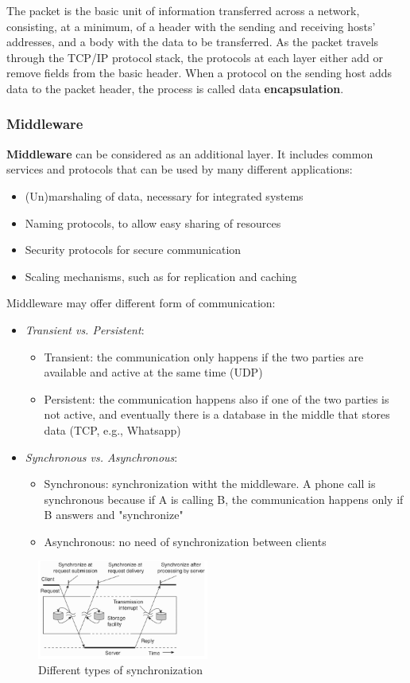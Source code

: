 \documentclass[10pt,a4paper]{article}
\begin{document}
The packet is the basic unit of information transferred across a network, consisting, at a minimum, of a header with the sending and receiving hosts' addresses, and a body with the data to be transferred. As the packet travels through the TCP/IP protocol stack, the protocols at each layer either add or remove fields from the basic header. When a protocol on the sending host adds data to the packet header, the process is called data \textbf{encapsulation}.
\subsubsection{Middleware}
\textbf{Middleware} can be considered as an additional layer. It includes common services and protocols that can be used by many different applications:
\begin{itemize}
	\item (Un)marshaling of data, necessary for integrated systems
	\item Naming protocols, to allow easy sharing of resources
	\item Security protocols for secure communication
	\item Scaling mechanisms, such as for replication and caching
\end{itemize}
Middleware may offer different form of communication:
\begin{itemize}
	\item \textit{Transient vs. Persistent}:
	\begin{itemize}
		\item Transient: the communication only happens if the two parties are available and active at the same time (UDP)
		\item Persistent: the communication happens also if one of the two parties is not active, and eventually there is a database in the middle that stores data (TCP, e.g., Whatsapp)
	\end{itemize}
	\item \textit{Synchronous vs. Asynchronous}:
	\begin{itemize}
		\item Synchronous: synchronization witht the middleware. A phone call is synchronous because if A is calling B, the communication happens only if B answers and "synchronize"
		\item Asynchronous: no need of synchronization between clients
	\end{itemize}
\end{itemize}
\begin{figure}[h!]
 \hfill \includegraphics[width=160pt]{images/middleware-sync.png}\hspace*{\fill}
 \caption{Different types of synchronization}
  \label{fig:middleware-sync}
\end{figure}
\pagebreak
\end{document}
